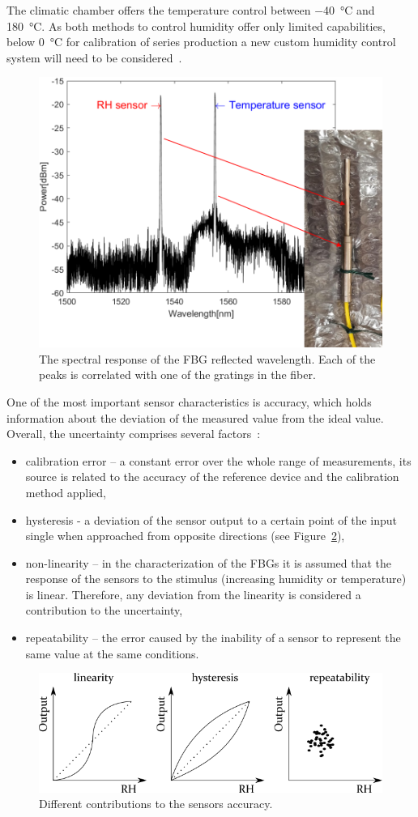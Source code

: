The climatic chamber offers the temperature control between \SI{-40}{\celsius} and \SI{180}{\celsius}. As both methods to control humidity offer only limited capabilities, below \SI{0}{\celsius} for calibration of series production a new custom humidity control system will need to be considered~\cite{Berruti, Veldscholte:2021wjt}.
\begin{figure}[!h]
\centering
\includegraphics[width=0.6\columnwidth]{Chapter5/images/hygr.png}
\caption{The spectral response of the FBG reflected wavelength. Each of the peaks is correlated with one of the gratings in the fiber.}
\label{fig_hygrometer1}
\end{figure}
\newpage
One of the most important sensor characteristics is accuracy, which holds information about the deviation of the measured value from the ideal value. Overall, the uncertainty comprises several factors~\cite{sensors_physics}:
\begin{itemize}
    \item calibration error -- a constant error over the whole range of measurements, its source is related to the accuracy of the reference device and the calibration method applied,
    \item hysteresis - a deviation of the sensor output to a certain point of the input single when approached from opposite directions (see Figure~\ref{fig:accuracy}), 
    \item non-linearity -- in the characterization of the \glspl{FBG} it is assumed that the response of the sensors to the stimulus (increasing humidity or temperature) is linear. Therefore, any deviation from the linearity is considered a contribution to the uncertainty,
    \item repeatability -- the error caused by the inability of a sensor to represent the same value at the same conditions. 
\end{itemize}
\begin{figure}[!h]
\centering
\includegraphics[width=0.85\columnwidth]{Chapter5/images/Picture2.png}
\caption{Different contributions to the sensors accuracy.}
\label{fig:accuracy}
\end{figure}
